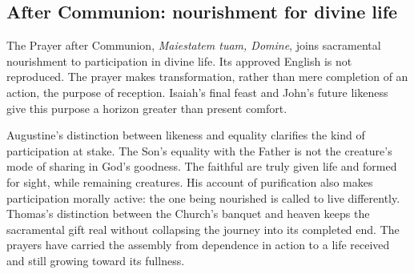 \subsection{After Communion: nourishment for divine life}
\label{proper-after-communion}
The Prayer after Communion, \textit{Maiestatem tuam, Domine}, joins sacramental nourishment to participation in divine life. Its approved English is not reproduced. The prayer makes transformation, rather than mere completion of an action, the purpose of reception. Isaiah's final feast and John's future likeness give this purpose a horizon greater than present comfort.

Augustine's distinction between likeness and equality clarifies the kind of participation at stake. The Son's equality with the Father is not the creature's mode of sharing in God's goodness. The faithful are truly given life and formed for sight, while remaining creatures. His account of purification also makes participation morally active: the one being nourished is called to live differently. Thomas's distinction between the Church's banquet and heaven keeps the sacramental gift real without collapsing the journey into its completed end. The prayers have carried the assembly from dependence in action to a life received and still growing toward its fullness.
